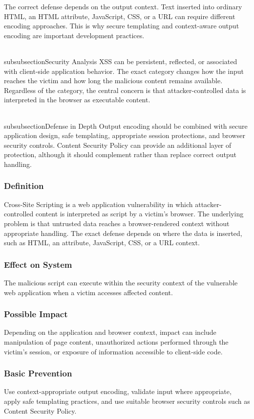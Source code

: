 \documentclass[11pt,a4paper]{article}
\begin{document}
The correct defense depends on the output context. Text inserted into ordinary HTML, an HTML attribute, JavaScript, CSS, or a URL can require different encoding approaches. This is why secure templating and context-aware output encoding are important development practices.

\\subsubsection{Security Analysis}
XSS can be persistent, reflected, or associated with client-side application behavior. The exact category changes how the input reaches the victim and how long the malicious content remains available. Regardless of the category, the central concern is that attacker-controlled data is interpreted in the browser as executable content.

\\subsubsection{Defense in Depth}
Output encoding should be combined with secure application design, safe templating, appropriate session protections, and browser security controls. Content Security Policy can provide an additional layer of protection, although it should complement rather than replace correct output handling.

\subsubsection{Definition}
Cross-Site Scripting is a web application vulnerability in which attacker-controlled content is interpreted as script by a victim's browser. The underlying problem is that untrusted data reaches a browser-rendered context without appropriate handling. The exact defense depends on where the data is inserted, such as HTML, an attribute, JavaScript, CSS, or a URL context.

\subsubsection{Effect on System}
The malicious script can execute within the security context of the vulnerable web application when a victim accesses affected content.

\subsubsection{Possible Impact}
Depending on the application and browser context, impact can include manipulation of page content, unauthorized actions performed through the victim's session, or exposure of information accessible to client-side code.

\subsubsection{Basic Prevention}
Use context-appropriate output encoding, validate input where appropriate, apply safe templating practices, and use suitable browser security controls such as Content Security Policy.
\end{document}
